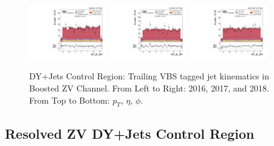 \begin{figure}[!ht]
  \includegraphics[width=0.30\textwidth]{analysis_plots/2016_zv/cr_vjets_l/vbf_j2_phi.pdf}
  \includegraphics[width=0.30\textwidth]{analysis_plots/2017_zv/cr_vjets_l/vbf_j2_phi.pdf}
  \includegraphics[width=0.30\textwidth]{analysis_plots/2018_zv/cr_vjets_l/vbf_j2_phi.pdf} \\
  \caption[DY+Jets Control Region: Trailing VBS tagged jet kinematics in Boosted ZV Channel]%
  {DY+Jets Control Region: Trailing VBS tagged jet kinematics in Boosted ZV Channel. From Left to Right: 2016,
    2017, and 2018. From Top to Bottom: \( p_T \), \( \eta \), \( \phi \).}%
  \label{fig:zv-cr-vjets-l-vbs2-pt-eta-m}
\end{figure}

\clearpage
\subsection{
  Resolved ZV DY+Jets Control Region
}

